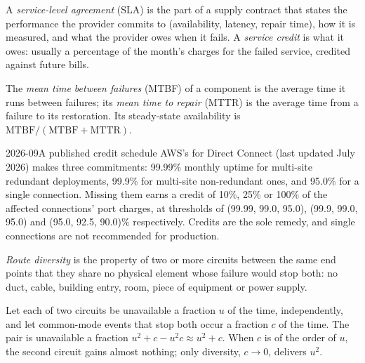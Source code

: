 \begin{definition}\label{def:nw:buying-connectivity:sla}
A \emph{service-level agreement} (SLA) is the part of a supply contract that states the performance the provider
commits to (availability, latency, repair time), how it is measured, and what the provider owes when it fails. A \emph{service credit} is what it owes: usually a percentage of the month's charges for the failed service, credited against future bills.
\end{definition}

\begin{definition}\label{def:nw:buying-connectivity:mtbf}
The \emph{mean time between failures} (MTBF) of a component is the average time it runs between failures; its
\emph{mean time to repair} (MTTR) is the average time from a failure to its restoration. Its steady-state availability is
$\mathrm{MTBF}/(\mathrm{MTBF}+\mathrm{MTTR})$.
\end{definition}

\begin{dated}{2026-09}{A published credit schedule}\label{dat:nw:buying-connectivity:sla}
AWS's  for Direct Connect (last updated July 2026) makes three commitments: 99.99\% monthly uptime for multi-site
redundant deployments, 99.9\% for multi-site non-redundant ones, and 95.0\% for a single connection. Missing them earns a credit of 10\%, 25\% or
100\% of the affected connections' port charges, at thresholds of (99.99, 99.0, 95.0), (99.9, 99.0, 95.0) and (95.0, 92.5, 90.0)\% respectively.
Credits are the sole remedy, and single connections are not recommended for production.
\end{dated}

\begin{definition}\label{def:nw:buying-connectivity:diversity}
\emph{Route diversity} is the property of two or more circuits between the same end points that they share no physical
element whose failure would stop both: no duct, cable, building entry, room, piece of equipment or power supply.
\end{definition}

\begin{proposition}\label{prop:nw:buying-connectivity:two}
Let each of two circuits be unavailable a fraction $u$ of the time, independently, and let common-mode events that stop both occur a fraction
$c$ of the time. The pair is unavailable a fraction $u^2 + c - u^2 c \approx u^2 + c$. When $c$ is of the order of $u$, the second circuit
gains almost nothing; only diversity, $c \to 0$, delivers $u^2$.
\end{proposition}

